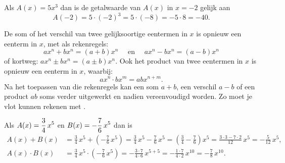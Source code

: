 \documentclass{ximera}
\begin{document}
\begin{example}
Als \( A(x) = 5x^3 \) dan is de getalwaarde van \( A(x) \) in \( x = -2 \) gelijk aan 
\[
A(-2) = 5 \cdot (-2)^3 = 5 \cdot (-8) = - 5 \cdot 8 = -40.
\]
\end{example}

De som of het verschil van twee gelijksoortige eentermen in \( x \) is opnieuw een eenterm in \( x \), met als rekenregels:
\[
ax^n + bx^n = (a+b)x^n \quad \text{ en } \quad ax^n - bx^n = (a-b)x^n
\]
of kortweg: \( ax^n \pm bx^n = (a\pm b)x^n \). Ook het product van twee eentermen in \( x \) is opnieuw een eenterm in \( x \), waarbij:
\[
ax^n \cdot bx^m = abx^{n+m}.
\]
Na het toepassen van die rekenregels kan een som \( a+b \), een verschil \( a-b \) of een product \( ab \) soms verder uitgewerkt en nadien vereenvoudigd worden. Zo moet je vlot kunnen rekenen met .

\begin{example}
Als \( \displaystyle A(x) = \frac{3}{4}\,x^5 \) en \( \displaystyle B(x) = -\frac{7}{6}\,x^5 \) dan is 
\begin{align*}
A(x) + B(x) & = \frac{3}{4}\,x^5 + \left(-\frac{7}{6}\,x^5\right) 
= \frac{3}{4}\,x^5 - \frac{7}{6}\,x^5
= \left(\frac{3}{4} - \frac{7}{6}\right)x^5 
= \frac{3 \cdot 3 - 7 \cdot 2}{12}\,x^5 
= -\frac{5}{12}\,x^5, \\
A(x) \cdot B(x) & = \frac{3}{4}\,x^5 \cdot \left(-\frac{7}{6}\,x^5\right) = - \frac{3 \cdot 7}{4 \cdot 6}\,x^{5+5} = -\frac{1\cdot 7}{4 \cdot 2}\, x^{10} = -\frac{7}{8}\,x^{10}. 
\end{align*}
\end{example}
\end{document}
